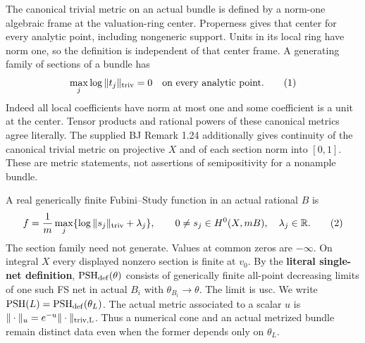 \documentclass[
  10pt,
]{article}
\begin{document}
The canonical trivial metric on an actual bundle is defined by a
norm-one algebraic frame at the valuation-ring center. Properness gives
that center for every analytic point, including nongeneric support.
Units in its local ring have norm one, so the definition is independent
of that center frame. A generating family of sections of a bundle has
\[\max_j\log\|t_j\|_{\rm triv}=0\quad\hbox{on every analytic point}.\tag{1}\]
Indeed all local coefficients have norm at most one and some coefficient
is a unit at the center. Tensor products and rational powers of these
canonical metrics agree literally. The supplied BJ Remark 1.24
additionally gives continuity of the canonical trivial metric on
projective \(X\) and of each section norm into \([0,1]\). These are
metric statements, not assertions of semipositivity for a nonample
bundle.

A real generically finite Fubini--Study function in an actual rational
\(B\) is \[f=\frac1m\max_j\{\log\|s_j\|_{\rm triv}+\lambda_j\},\qquad
0\ne s_j\in H^0(X,mB),\quad \lambda_j\in\mathbb R.\tag{2}\] The section
family need not generate. Values at common zeros are \(-\infty\). On
integral \(X\) every displayed nonzero section is finite at \(v_0\). By
the \textbf{literal single-net definition},
\(\operatorname{PSH}_{\rm def}(\theta)\) consists of generically finite
all-point decreasing limits of one such FS net in actual \(B_i\) with
\(\theta_{B_i}\longrightarrow\theta\). The limit is usc. We write
\(\operatorname{PSH}(L)=\operatorname{PSH}_{\rm def}(\theta_L)\). The
actual metric associated to a scalar \(u\) is
\(\|\cdot\|_u=e^{-u}\|\cdot\|_{\rm triv,L}\). Thus a numerical cone and
an actual metrized bundle remain distinct data even when the former
depends only on \(\theta_L\).
\end{document}
